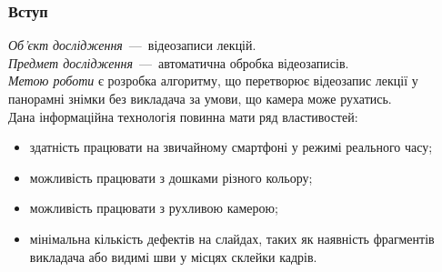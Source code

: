 \begin{frame}
    \frametitle{Вступ}
    \textit{Об'єкт дослідження}~---~відеозаписи лекцій. \\
    \textit{Предмет дослідження}~---~автоматична обробка відеозаписів. \\
    \textit{Метою роботи} є розробка алгоритму, що перетворює 
    відеозапис лекції у панорамні знімки без викладача
    за умови, що камера може рухатись. \\

    Дана інформаційна технологія повинна мати ряд властивостей:
    \begin{itemize}
        \item здатність працювати на звичайному смартфоні у режимі реального часу;
        \item можливість працювати з дошками різного кольору;
        \item можливість працювати з рухливою камерою;
        \item мінімальна кількість дефектів на слайдах,
            таких як наявність фрагментів викладача
            або видимі шви у місцях склейки кадрів.
    \end{itemize}
\end{frame}
